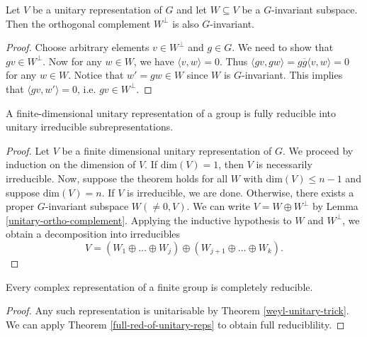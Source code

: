 \begin{lemma}\label{unitary-ortho-complement}
Let $V$ be a unitary representation of $G$ and let $W \subseteq V$ be a $G$-invariant subspace.  Then the orthogonal complement $W^\perp$ is also $G$-invariant.
\end{lemma}
\begin{proof}
Choose arbitrary elements $v \in W^\perp$ and $g \in G$.  We need to show that $gv \in W^\perp$.  Now for any $w \in W$, we have $\langle v,w \rangle = 0$.  Thus $\langle gv, gw \rangle = g \overline{g} \langle v , w \rangle = 0$ for any $w \in W$.  Notice that $w' = gw \in W$ since $W$ is $G$-invariant.  This implies that $ \langle gv, w' \rangle =0$, i.e. $gv \in W^\perp$.
\end{proof}


\begin{thm}\label{full-red-of-unitary-reps}
A finite-dimensional unitary representation of a group is fully reducible into unitary irreducible subrepresentations.
\end{thm}
\begin{proof}
Let $V$ be a finite dimensional unitary representation of $G$. We proceed by induction on the dimension of $V$.  If $\text{dim}(V)=1$, then $V$ is necessarily irreducible.  Now, suppose the theorem holds for all $W$ with $\text{dim}(V) \leq n - 1$ and suppose $\text{dim}(V)=n$. If $V$ is irreducible, we are done. Otherwise, there exists a proper $G$-invariant subspace $W (\neq 0, V)$.  
We can write $V = W \oplus W^\perp$ by Lemma \ref{unitary-ortho-complement}.  Applying the inductive hypothesis to $W$ and $W^\perp$, we obtain a decomposition into irreducibles
\[ V = (W_1 \oplus \ldots \oplus W_j) \oplus (W_{j + 1} \oplus \ldots \oplus W_k). \]
\end{proof}

\begin{cor}
Every complex representation of a finite group is completely reducible.
\end{cor}
\begin{proof}
Any such representation is unitarisable by Theorem \ref{weyl-unitary-trick}.  We can apply Theorem \ref{full-red-of-unitary-reps} to obtain full reduciblility.
\end{proof}

